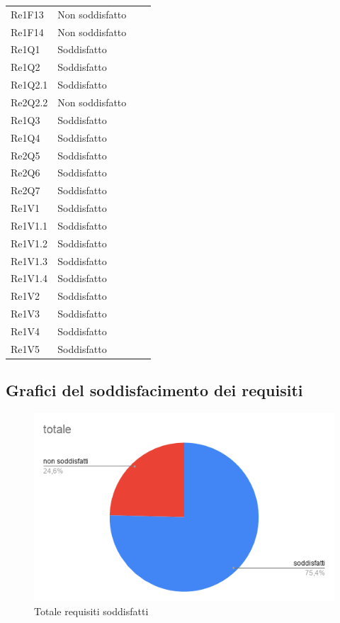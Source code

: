 \begin{longtable}{C{3cm} C{3cm} L{5.5cm} C{3cm}}
Re1F13 	& Non soddisfatto\\
Re1F14 	& Non soddisfatto\\
Re1Q1 	& Soddisfatto\\
Re1Q2 	& Soddisfatto\\
Re1Q2.1 & Soddisfatto\\
Re2Q2.2 & Non soddisfatto\\
Re1Q3 	& Soddisfatto\\
Re1Q4 	& Soddisfatto\\
Re2Q5 	& Soddisfatto\\
Re2Q6 	& Soddisfatto\\
Re2Q7 	& Soddisfatto\\
Re1V1 	& Soddisfatto\\
Re1V1.1 & Soddisfatto\\
Re1V1.2 & Soddisfatto\\
Re1V1.3 & Soddisfatto\\
Re1V1.4 & Soddisfatto\\
Re1V2 	& Soddisfatto\\
Re1V3 	& Soddisfatto\\
Re1V4 	& Soddisfatto\\
Re1V5 	& Soddisfatto\\
\end{longtable}

\subsection{Grafici del soddisfacimento dei requisiti}

\begin{figure}[H]
\centering
\includegraphics[scale=0.75]{img/grafici/totale.png}
\caption{Totale requisiti soddisfatti}
\end{figure}

